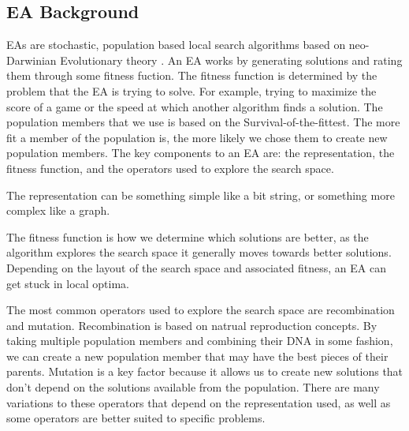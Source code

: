 \documentclass{IEEEtran}
\begin{document}
\subsection{EA Background}
EAs are stochastic, population based local search algorithms based on neo-Darwinian Evolutionary theory \cite{b3}. An EA works by generating solutions and rating them through some fitness fuction. The fitness function is determined by the problem that the EA is trying to solve. For example, trying to maximize the score of a game or the speed at which another algorithm finds a solution. The population members that we use is based on the Survival-of-the-fittest. The more fit a member of the population is, the more likely we chose them to create new population members. The key components to an EA are: the representation, the fitness function, and the operators used to explore the search space.

The representation can be something simple like a bit string, or something more complex like a graph.

The fitness function is how we determine which solutions are better, as the algorithm explores the search space it generally moves towards better solutions. Depending on the layout of the search space and associated fitness, an EA can get stuck in local optima.

The most common operators used to explore the search space are recombination and mutation. Recombination is based on natrual reproduction concepts. By taking multiple population members and combining their DNA in some fashion, we can create a new population member that may have the best pieces of their parents. Mutation is a key factor because it allows us to create new solutions that don't depend on the solutions available from the population. There are many variations to these operators that depend on the representation used, as well as some operators are better suited to specific problems.
\end{document}
